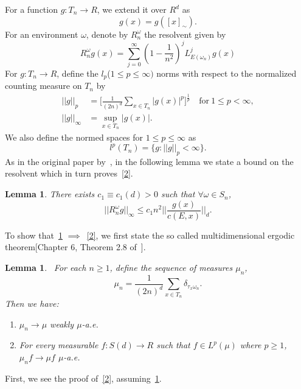 \documentclass[final]{aomart}
\def\mathscr#1{#1}%
\def\mathbb#1{#1}%
\theoremstyle{plain}
\newtheorem{lemma}[theorem]{Lemma}
\theoremstyle{definition}
\theoremstyle{remark}
\begin{document}
For a function $g: T_n \to \mathbb{R}$, we extend it over $\mathbb{R}^d$ as \[
g(x) = g([x]_\sim).
\] 
For an environment $\omega$, denote by $R_n^{\omega}$ the resolvent given by \[
R_n^{\omega} g(x) = \sum_{j=0}^{\infty} (1-\frac{1}{n^2})^j L_{\mathscr{E}({\omega_n})}^j g(x) 
\]
For $g:T_n \to \mathbb{R}$, define the $l_p$($1\leq p\leq \infty)$ norms with respect to the normalized counting measure on $T_n$ by \begin{align*}
||g||_p 
&=\big[\frac{1}{(2n)^d}\sum_{x \in T_n } |g(x)|^p \big]^{\frac{1}{p}}\quad\text{for}~1\leq p <\infty,\\
||g||_{\infty} 
&= \sup_{x \in T_n} |g(x)| . 
\end{align*}
We also define the normed spaces for $1\leq p \leq\infty$ as \[
l^p(T_n) =\{ g: ||g||_p <\infty \}.
\]
As in the original paper by~\cite{Lawler1982}, in the following lemma we state a bound on the resolvent which in turn proves~\ref{2}.

\begin{lemma}\label{3}
There exists $c_1\equiv c_1(d)>0$ such that $\forall \omega \in \mathscr{S}_n$, \[
||R^{\omega}_ng||_{\infty} \leq c_1 n^2||\frac{g(x)}{c(\mathscr{E},x)}||_d. 
\]
\end{lemma}

To show that~\ref{3} $\implies$~\ref{2}, we first state the so called multidimensional ergodic theorem[Chapter 6, Theorem 2.8 of~\cite{Krengel1985}].
\begin{lemma}~\label{4}
    For each $n\geq 1$, define the sequence of measures $\mu_n$, \[
    \mu_n = \frac{1}{(2n)^d} \sum_{x \in T_n} \delta_{\tau_x \omega_n}.
    \]
    Then we have:\begin{enumerate}
  \item $\mu_n \to \mu$ weakly $\mu$-a.e.
  \item For every measurable $f:S(d) \to \mathbb{R}$ such that $f \in L^p(\mu)$ where $p \geq 1$, $\mu_n f \to \mu f$ $\mu$-a.e.
\end{enumerate}
\end{lemma}
First, we see the proof of~\ref{2}, assuming~\ref{3}.
\end{document}
